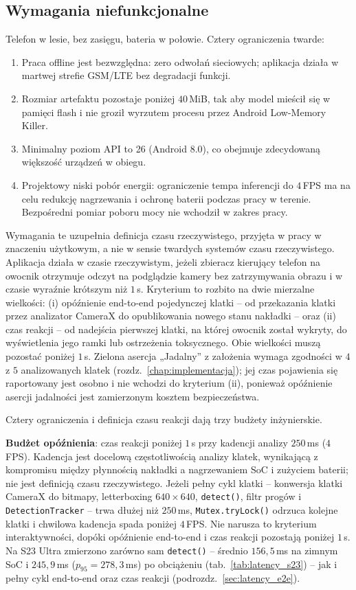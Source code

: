 \subsection{Wymagania niefunkcjonalne}\label{sec:wymagania_niefunkcjonalne}
Telefon w lesie, bez zasięgu, bateria w połowie. Cztery ograniczenia twarde:
\begin{enumerate}
 \item Praca offline jest bezwzględna: zero odwołań sieciowych; aplikacja działa w martwej strefie GSM/LTE bez degradacji funkcji.
 \item Rozmiar artefaktu pozostaje poniżej $40$\,MiB, tak aby model mieścił się w pamięci flash i nie groził wyrzutem procesu przez Android Low-Memory Killer.
 \item Minimalny poziom API to 26 (Android 8.0), co obejmuje zdecydowaną większość urządzeń w obiegu.
 \item Projektowy niski pobór energii: ograniczenie tempa inferencji do $4$\,FPS ma na celu redukcję nagrzewania i ochronę baterii podczas pracy w terenie. Bezpośredni pomiar poboru mocy nie wchodził w zakres pracy.
\end{enumerate}

Wymagania te uzupełnia definicja czasu rzeczywistego, przyjęta w pracy w znaczeniu użytkowym, a nie w sensie twardych systemów czasu rzeczywistego. Aplikacja działa w czasie rzeczywistym, jeżeli zbieracz kierujący telefon na owocnik otrzymuje odczyt na podglądzie kamery bez zatrzymywania obrazu i w czasie wyraźnie krótszym niż $1$\,s. Kryterium to rozbito na dwie mierzalne wielkości: (i) opóźnienie end-to-end pojedynczej klatki -- od przekazania klatki przez analizator CameraX do opublikowania nowego stanu nakładki -- oraz (ii) czas reakcji -- od nadejścia pierwszej klatki, na której owocnik został wykryty, do wyświetlenia jego ramki lub ostrzeżenia toksycznego. Obie wielkości muszą pozostać poniżej $1$\,s. Zielona asercja „Jadalny” z założenia wymaga zgodności w $4$ z $5$ analizowanych klatek (rozdz.~\ref{chap:implementacja}); jej czas pojawienia się raportowany jest osobno i nie wchodzi do kryterium (ii), ponieważ opóźnienie asercji jadalności jest zamierzonym kosztem bezpieczeństwa.

Cztery ograniczenia i definicja czasu reakcji dają trzy budżety inżynierskie.

\textbf{Budżet opóźnienia}: czas reakcji poniżej $1$\,s przy kadencji analizy $250$\,ms ($4$\,FPS). Kadencja jest docelową częstotliwością analizy klatek, wynikającą z kompromisu między płynnością nakładki a nagrzewaniem SoC i zużyciem baterii; nie jest definicją czasu rzeczywistego. Jeżeli pełny cykl klatki -- konwersja klatki CameraX do bitmapy, letterboxing $640\times640$, \texttt{detect()}, filtr progów i \texttt{DetectionTracker} -- trwa dłużej niż $250$\,ms, \texttt{Mutex.tryLock()} odrzuca kolejne klatki i chwilowa kadencja spada poniżej $4$\,FPS. Nie narusza to kryterium interaktywności, dopóki opóźnienie end-to-end i czas reakcji pozostają poniżej $1$\,s. Na S23 Ultra zmierzono zarówno sam \texttt{detect()} -- średnio $156{,}5$\,ms na zimnym SoC i $245{,}9$\,ms ($p_{95}=278{,}3$\,ms) po obciążeniu (tab.~\ref{tab:latency_s23}) -- jak i pełny cykl end-to-end oraz czas reakcji (podrozdz.~\ref{sec:latency_e2e}).

